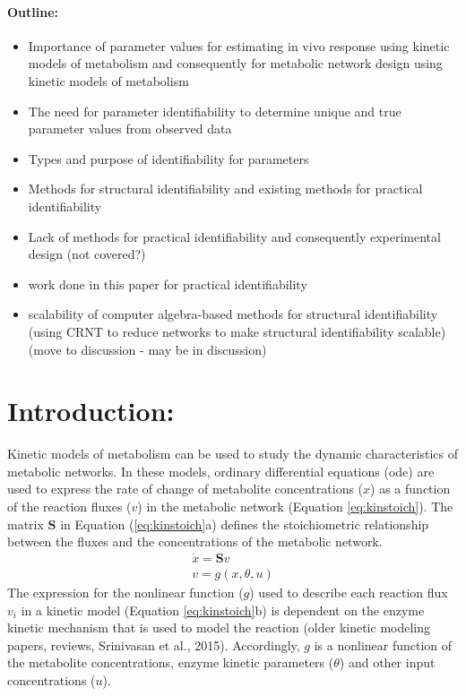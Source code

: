 \documentclass[10pt]{article}
\begin{document}
\paragraph{Outline:}
\begin{itemize}
	\item Importance of parameter values for estimating in vivo response using kinetic models of metabolism and consequently for metabolic network design using kinetic models of metabolism
	\item The need for parameter identifiability to determine unique and true parameter values from observed data
	\item Types and purpose of identifiability for parameters
	\item Methods for structural identifiability and existing methods for practical identifiability
	\item Lack of methods for practical identifiability and consequently experimental design (not covered?)
	\item work done in this paper for practical identifiability			
	\item scalability of computer algebra-based methods for structural identifiability (using CRNT to reduce networks to make structural identifiability scalable) (move to discussion - may be in discussion)
\end{itemize}
\section{Introduction:}
Kinetic models of metabolism can be used to study the dynamic characteristics of metabolic networks. In these models, ordinary differential equations (ode) are used to express the rate of change of metabolite concentrations ($x$) as a function of the reaction fluxes ($v$) in the metabolic network (Equation \ref{eq:kinstoich}). The matrix $\mathbf{S}$ in Equation (\ref{eq:kinstoich}a) defines the stoichiometric relationship between the fluxes and the concentrations of the metabolic network.
\begin{subequations}\label{eq:kinstoich}
	\begin{align}
	\dot{x} = \mathbf{S}v\\
	v = g(x, \theta, u)
	\end{align}
\end{subequations}
The expression for the nonlinear function ($g$) used to describe each reaction flux $v_i$ in a kinetic model (Equation \ref{eq:kinstoich}b) is dependent on the enzyme kinetic mechanism that is used to model the reaction (older kinetic modeling papers, reviews, Srinivasan et al., 2015). Accordingly, $g$ is a nonlinear function of the metabolite concentrations, enzyme kinetic parameters ($\theta$) and other input concentrations ($u$). 
\end{document}
